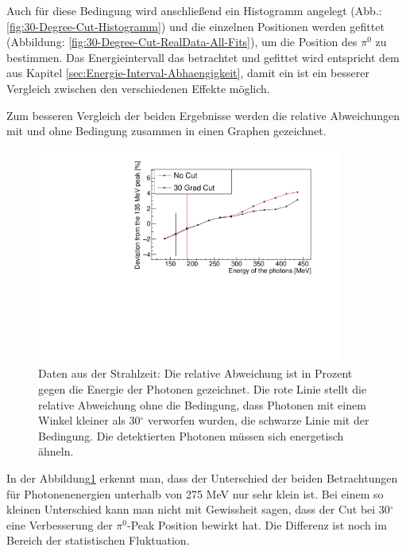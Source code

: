 \documentclass[a4paper,11pt,oneside,final,german,openbib,pdftex]{scrbook}
\begin{document}
{Auch f\"ur diese Bedingung wird anschlie{\ss}end ein Histogramm angelegt (Abb.: \ref{fig:30-Degree-Cut-Histogramm}) und die einzelnen Positionen werden gefittet (Abbildung: \ref{fig:30-Degree-Cut-RealData-All-Fits}), um die Position des $\pi^0$ zu bestimmen. Das Energieintervall das betrachtet und gefittet wird entspricht dem aus Kapitel \ref{sec:Energie-Interval-Abhaengigkeit}, damit ein ist ein besserer Vergleich zwischen den verschiedenen Effekte m\"oglich.

Zum besseren Vergleich der beiden Ergebnisse werden die relative Abweichungen mit und ohne Bedingung zusammen in einen Graphen gezeichnet.
\begin{figure}[h!]
	\begin{center}
		\includegraphics[width=100mm]{20172804StrahlzeitDeviation}
		\caption[Strahlzeit: Symmetrische Photonen; Vernachl\"assigung der Detektoren am Rand; Abweichung]{Daten aus der Strahlzeit: Die relative Abweichung ist in Prozent gegen die Energie der Photonen gezeichnet. Die rote Linie stellt die relative Abweichung ohne die Bedingung, dass Photonen mit einem Winkel kleiner als 30$^{\circ}$ verworfen wurden, die schwarze Linie mit der Bedingung. Die detektierten Photonen m\"ussen sich energetisch \"ahneln.}
		\label{fig:Vernachlaessigung-Detektoren-am-Rand}
	\end{center}
\end{figure}

 

In der Abbildung\ref{fig:Vernachlaessigung-Detektoren-am-Rand} erkennt man, dass der Unterschied der beiden Betrachtungen f\"ur Photonenenergien unterhalb von 275 MeV nur sehr klein ist. Bei einem so kleinen Unterschied kann man nicht mit Gewissheit sagen, dass der Cut bei 30$^{\circ}$ eine Verbesserung der $\pi^0$-Peak Position bewirkt hat. Die Differenz ist noch im Bereich der statistischen Fluktuation. 

}
\end{document}
